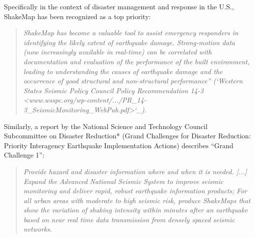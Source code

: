 \documentclass[letterpaper,10pt,english]{sphinxmanual}
\begin{document}
\begin{figure}[htbp]\begin{flushleft}
\capstart

\texttt{[image: \{Hector\_Mine\_ShakeMap]}.png}
\caption{Instrumental Intensity ShakeMap for the 1999
M7.1 Hector Mine, CA earthquake. (Map regenerated in 2006)}\label{shakemap_applications:hector-mine-shakemap}\label{shakemap_applications:id2}\end{flushleft}\end{figure}

Specifically in the context of disaster management and response in the
U.S., ShakeMap has been recognized as a top priority:
\begin{quote}

\emph{ShakeMap has
become a valuable tool to assist emergency responders in identifying
the likely extent of earthquake damage. Strong-motion data (now
increasingly available in real-time) can be correlated with
documentation and evaluation of the performance of the built
environment, leading to understanding the causes of earthquake damage
and the occurrence of good structural and non-structural performance''
({}`Western States Seismic Policy Council Policy Recommendation 14-3 \textless{}www.wsspc.org/wp-content/.../PR\_14-3\_SeismicMonitoring\_WebPub.pdf\textgreater{}{}`\_).}
\end{quote}

Similarly, a report by the National Science and Technology Council Subcommittee on Disaster Reduction* (Grand Challenges for Disaster Reduction: Priority Interagency Earthquake Implementation Actions) describes “Grand Challenge 1”:
\begin{quote}

\emph{Provide hazard and disaster information where and when it is needed. {[}...{]}
Expand the Advanced National Seismic System to improve seismic monitoring and
deliver rapid, robust earthquake information products; For all urban areas with
moderate to high seismic risk, produce ShakeMaps that show the variation of
shaking intensity within minutes after an earthquake based on near real time data
transmission from densely spaced seismic networks.}
\end{quote}
\end{document}
